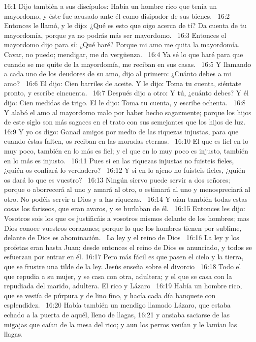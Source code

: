 16:1 Dijo también a sus discípulos: Había un hombre rico que tenía un mayordomo, y éste fue acusado ante él como disipador de sus bienes.  
16:2 Entonces le llamó, y le dijo: ¿Qué es esto que oigo acerca de tí? Da cuenta de tu mayordomía, porque ya no podrás más ser mayordomo.  
16:3 Entonces el mayordomo dijo para sí: ¿Qué haré? Porque mi amo me quita la mayordomía. Cavar, no puedo; mendigar, me da vergüenza.  
16:4 Ya sé lo que haré para que cuando se me quite de la mayordomía, me reciban en sus casas.  
16:5 Y llamando a cada uno de los deudores de su amo, dijo al primero: ¿Cuánto debes a mi amo?  
16:6 El dijo: Cien barriles de aceite. Y le dijo: Toma tu cuenta, siéntate pronto, y escribe cincuenta.  
16:7 Después dijo a otro: Y tú, ¿cuánto debes? Y él dijo: Cien medidas de trigo. El le dijo: Toma tu cuenta, y escribe ochenta.  
16:8 Y alabó el amo al mayordomo malo por haber hecho sagazmente; porque los hijos de este siglo son más sagaces en el trato con sus semejantes que los hijos de luz.  
16:9 Y yo os digo: Ganad amigos por medio de las riquezas injustas, para que cuando éstas falten, os reciban en las moradas eternas.  
16:10 El que es fiel en lo muy poco, también en lo más es fiel; y el que en lo muy poco es injusto, también en lo más es injusto.  
16:11 Pues si en las riquezas injustas no fuisteis fieles, ¿quién os confiará lo verdadero?  
16:12 Y si en lo ajeno no fuisteis fieles, ¿quién os dará lo que es vuestro?  
16:13 Ningún siervo puede servir a dos señores; porque o aborrecerá al uno y amará al otro, o estimará al uno y menospreciará al otro. No podéis servir a Dios y a las riquezas.  
16:14 Y oían también todas estas cosas los fariseos, que eran avaros, y se burlaban de él.  
16:15 Entonces les dijo: Vosotros sois los que os justificáis a vosotros mismos delante de los hombres; mas Dios conoce vuestros corazones; porque lo que los hombres tienen por sublime, delante de Dios es abominación.  
La ley y el reino de Dios  
16:16 La ley y los profetas eran hasta Juan; desde entonces el reino de Dios es anunciado, y todos se esfuerzan por entrar en él. 
16:17 Pero más fácil es que pasen el cielo y la tierra, que se frustre una tilde de la ley. 
Jesús enseña sobre el divorcio   
16:18 Todo el que repudia a su mujer, y se casa con otra, adultera; y el que se casa con la repudiada del marido, adultera. 
El rico y Lázaro  
16:19 Había un hombre rico, que se vestía de púrpura y de lino fino, y hacía cada día banquete con esplendidez.  
16:20 Había también un mendigo llamado Lázaro, que estaba echado a la puerta de aquél, lleno de llagas, 
16:21 y ansiaba saciarse de las migajas que caían de la mesa del rico; y aun los perros venían y le lamían las llagas.  
